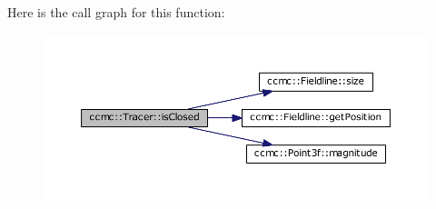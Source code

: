 Here is the call graph for this function\-:\nopagebreak
\begin{figure}[H]
\begin{center}
\leavevmode
\includegraphics[width=350pt]{classccmc_1_1_tracer_aee62bc5b0bb724545d1fd32ae2af343f_cgraph}
\end{center}
\end{figure}


